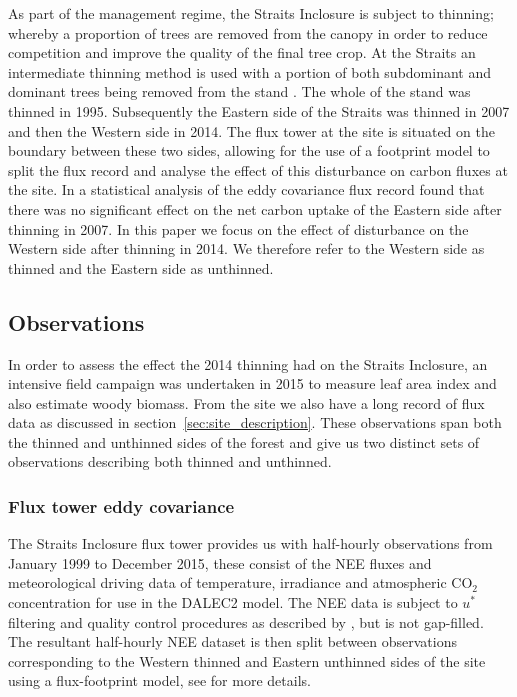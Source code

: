 \documentclass[12pt]{article}
\begin{document}
As part of the management regime, the Straits Inclosure is subject to thinning; whereby a proportion of trees are removed from the canopy in order to reduce competition and improve the quality of the final tree crop. At the Straits an intermediate thinning method is used with a portion of both subdominant and dominant trees being removed from the stand \citep{kerr2011thinning}. The whole of the stand was thinned in 1995. Subsequently the Eastern side of the Straits was thinned in 2007 and then the Western side in 2014. The flux tower at the site is situated on the boundary between these two sides, allowing for the use of a footprint model to split the flux record and analyse the effect of this disturbance on carbon fluxes at the site. In \citet{wilkinson2015effects} a statistical analysis of the eddy covariance flux record found that there was no significant effect on the net carbon uptake of the Eastern side after thinning in 2007. In this paper we focus on the effect of disturbance on the Western side after thinning in 2014. We therefore refer to the Western side as thinned and the Eastern side as unthinned.   

\subsection{Observations} \label{sec:obs}

In order to assess the effect the 2014 thinning had on the Straits Inclosure, an intensive field campaign was undertaken in 2015 to measure leaf area index and also estimate woody biomass. From the site we also have a long record of flux data as discussed in section~\ref{sec:site_description}. These observations span both the thinned and unthinned sides of the forest and give us two distinct sets of observations describing both thinned and unthinned.

\subsubsection{Flux tower eddy covariance} \label{sec:eddycov} 

The Straits Inclosure flux tower provides us with half-hourly observations from January 1999 to December 2015, these consist of the NEE fluxes and meteorological driving data of temperature, irradiance and atmospheric CO\(_{2}\) concentration for use in the DALEC2 model. The NEE data is subject to \(u^*\) filtering and quality control procedures as described by \citet{papale2006towards}, but is not gap-filled. The resultant half-hourly NEE dataset is then split between observations corresponding to the Western thinned and Eastern unthinned sides of the site using a flux-footprint model, see \citet{wilkinson2015effects} for more details.  
\end{document}
